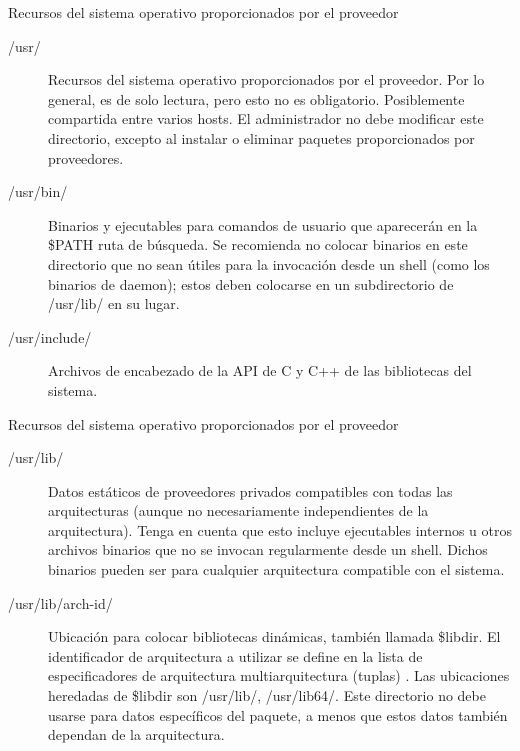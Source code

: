 \begin{frame}[c]{Recursos del sistema operativo proporcionados por el proveedor}
  \begin{description}
    \item [/usr/] Recursos del sistema operativo proporcionados por el
			proveedor. Por lo general, es de solo lectura, pero esto no es
			obligatorio. Posiblemente compartida entre varios hosts.
			El administrador no debe modificar este directorio, excepto al
			instalar o eliminar paquetes proporcionados por proveedores.
    \pausa
    \item [/usr/bin/] Binarios y ejecutables para comandos de usuario que
			aparecerán en la \$PATH ruta de búsqueda. Se recomienda no colocar
			binarios en este directorio que no sean útiles para la invocación
			desde un shell (como los binarios de daemon); estos deben colocarse en
			un subdirectorio de /usr/lib/ en su lugar.
    \pausa
    \item [/usr/include/] Archivos de encabezado de la API de C y C++ de
      las bibliotecas del sistema.
  \end{description}
\end{frame}

\begin{frame}[c]{Recursos del sistema operativo proporcionados por el proveedor}
  \begin{description}
    \item [/usr/lib/] Datos estáticos de proveedores privados compatibles con
      todas las arquitecturas (aunque no necesariamente independientes de la
      arquitectura). Tenga en cuenta que esto incluye ejecutables internos u
      otros archivos binarios que no se invocan regularmente desde un shell.
      Dichos binarios pueden ser para cualquier arquitectura compatible con
      el sistema.
    \pausa
    \item [/usr/lib/arch-id/] Ubicación para colocar bibliotecas dinámicas,
      también llamada \$libdir. El identificador de arquitectura a utilizar
      se define en la lista de especificadores de arquitectura
      multiarquitectura (tuplas) . Las ubicaciones heredadas de \$libdir
      son /usr/lib/, /usr/lib64/. Este directorio no debe usarse para datos
      específicos del paquete, a menos que estos datos también dependan de la
      arquitectura.
  \end{description}
\end{frame}

